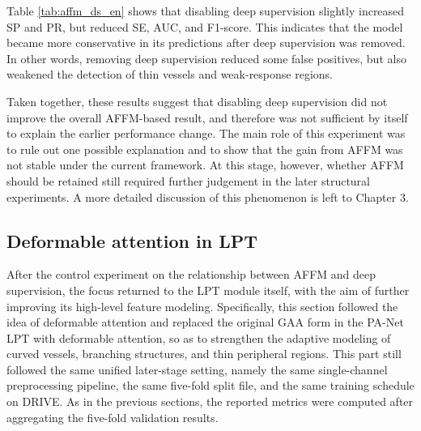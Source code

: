 \documentclass[a4paper,12pt]{article}
\begin{document}
\begin{table}[htbp]
\centering
\caption{Comparison of AFFM results with and without deep supervision}
\label{tab:affm_ds_en}
\end{table}

Table \ref{tab:affm_ds_en} shows that disabling deep supervision slightly increased SP and PR, but reduced SE, AUC, and F1-score. This indicates that the model became more conservative in its predictions after deep supervision was removed. In other words, removing deep supervision reduced some false positives, but also weakened the detection of thin vessels and weak-response regions.

Taken together, these results suggest that disabling deep supervision did not improve the overall AFFM-based result, and therefore was not sufficient by itself to explain the earlier performance change. The main role of this experiment was to rule out one possible explanation and to show that the gain from AFFM was not stable under the current framework. At this stage, however, whether AFFM should be retained still required further judgement in the later structural experiments. A more detailed discussion of this phenomenon is left to Chapter 3.

\subsection{Deformable attention in LPT}

After the control experiment on the relationship between AFFM and deep supervision, the focus returned to the LPT module itself, with the aim of further improving its high-level feature modeling. Specifically, this section followed the idea of deformable attention \cite{zhu2021deformabledetr} and replaced the original GAA form in the PA-Net LPT \cite{luo2025panet} with deformable attention, so as to strengthen the adaptive modeling of curved vessels, branching structures, and thin peripheral regions. This part still followed the same unified later-stage setting, namely the same single-channel preprocessing pipeline, the same five-fold split file, and the same training schedule on DRIVE. As in the previous sections, the reported metrics were computed after aggregating the five-fold validation results.
\end{document}

